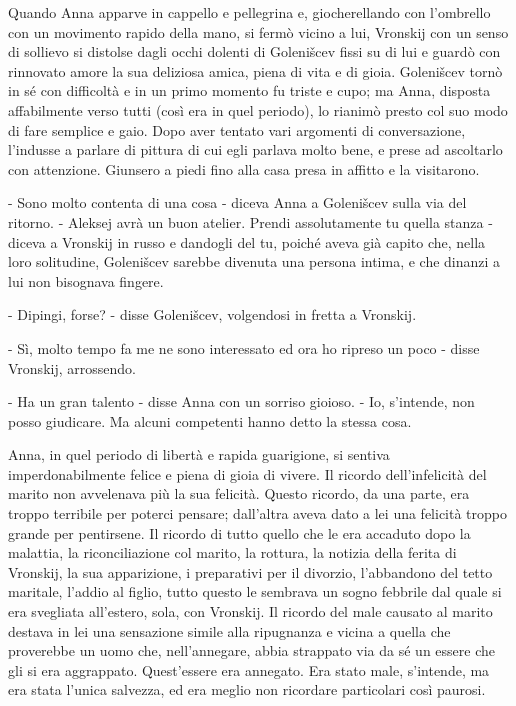 Quando Anna apparve in cappello e pellegrina e, giocherellando con l'ombrello con un movimento rapido della mano, si fermò vicino a lui, Vronskij con un senso di sollievo si distolse dagli occhi dolenti di Golenišcev fissi su di lui e guardò con rinnovato amore la sua deliziosa amica, piena di vita e di gioia. Golenišcev tornò in sé con difficoltà e in un primo momento fu triste e cupo; ma Anna, disposta affabilmente verso tutti (così era in quel periodo), lo rianimò presto col suo modo di fare semplice e gaio. Dopo aver tentato vari argomenti di conversazione, l'indusse a parlare di pittura di cui egli parlava molto bene, e prese ad ascoltarlo con attenzione. Giunsero a piedi fino alla casa presa in affitto e la visitarono. 

- Sono molto contenta di una cosa - diceva Anna a Golenišcev sulla via del ritorno. - Aleksej avrà un buon atelier. Prendi assolutamente tu quella stanza - diceva a Vronskij in russo e dandogli del tu, poiché aveva già capito che, nella loro solitudine, Golenišcev sarebbe divenuta una persona intima, e che dinanzi a lui non bisognava fingere. 

- Dipingi, forse? - disse Golenišcev, volgendosi in fretta a Vronskij. 

- Sì, molto tempo fa me ne sono interessato ed ora ho ripreso un poco - disse Vronskij, arrossendo. 

- Ha un gran talento - disse Anna con un sorriso gioioso. - Io, s'intende, non posso giudicare. Ma alcuni competenti hanno detto la stessa cosa. 

Anna, in quel periodo di libertà e rapida guarigione, si sentiva imperdonabilmente felice e piena di gioia di vivere. Il ricordo dell'infelicità del marito non avvelenava più la sua felicità. Questo ricordo, da una parte, era troppo terribile per poterci pensare; dall'altra aveva dato a lei una felicità troppo grande per pentirsene. Il ricordo di tutto quello che le era accaduto dopo la malattia, la riconciliazione col marito, la rottura, la notizia della ferita di Vronskij, la sua apparizione, i preparativi per il divorzio, l'abbandono del tetto maritale, l'addio al figlio, tutto questo le sembrava un sogno febbrile dal quale si era svegliata all'estero, sola, con Vronskij. Il ricordo del male causato al marito destava in lei una sensazione simile alla ripugnanza e vicina a quella che proverebbe un uomo che, nell'annegare, abbia strappato via da sé un essere che gli si era aggrappato. Quest'essere era annegato. Era stato male, s'intende, ma era stata l'unica salvezza, ed era meglio non ricordare particolari così paurosi. 

